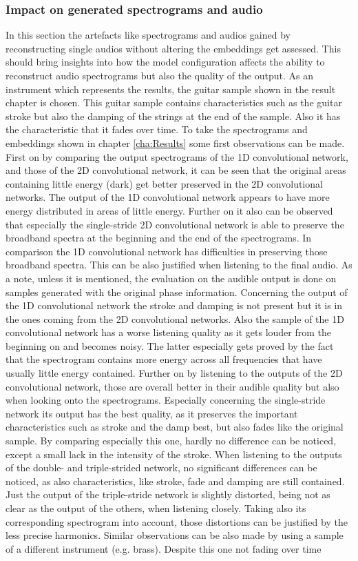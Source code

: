 \subsubsection{Impact on generated spectrograms and audio}
In this section the artefacts like spectrograms and audios gained by reconstructing single audios without altering the embeddings get assessed. This should bring insights into how the model configuration affects the ability to reconstruct audio spectrograms but also the quality of the output. As an instrument which represents the results, the guitar sample shown in the result chapter is chosen. This guitar sample contains characteristics such as the guitar stroke but also the damping of the strings at the end of the sample. Also it has the characteristic that it fades over time. To take the spectrograms and embeddings shown in chapter \ref{cha:Results} some first observations can be made. First on by comparing the output spectrograms of the 1D convolutional network, and those of the 2D convolutional network, it can be seen that the original areas containing little energy (dark) get better preserved in the 2D convolutional networks. The output of the 1D convolutional network appears to have more energy distributed in areas of little energy. Further on it also can be observed that especially the single-stride 2D convolutional network is able to preserve the broadband spectra at the beginning and the end of the spectrograms. In comparison the 1D convolutional network has difficulties in preserving those broadband spectra. This can be also justified when listening to the final audio. As a note, unless it is mentioned, the evaluation on the audible output is done on samples generated with the original phase information. Concerning the output of the 1D convolutional network the stroke and damping is not present but it is in the ones coming from the 2D convolutional networks. Also the sample of the 1D convolutional network has a worse listening quality as it gets louder from the beginning on and becomes noisy. The latter especially gets proved by the fact that the spectrogram contains more energy across all frequencies that have usually little energy contained. Further on by listening to the outputs of the 2D convolutional network, those are overall better in their audible quality but also when looking onto the spectrograms. Especially concerning the single-stride network its output has the best quality, as it preserves the important characteristics such as stroke and the damp best, but also fades like the original sample. By comparing especially this one, hardly no difference can be noticed, except a small lack in the intensity of the stroke. When listening to the outputs of the double- and triple-strided network, no significant differences can be noticed, as also characteristics, like stroke, fade and damping are still contained. Just the output of the triple-stride network is slightly distorted, being not as clear as the output of the others, when listening closely. Taking also its corresponding spectrogram into account, those distortions can be justified by the less precise harmonics. Similar observations can be also made by using a sample of a different instrument (e.g. brass). Despite this one not fading over time 